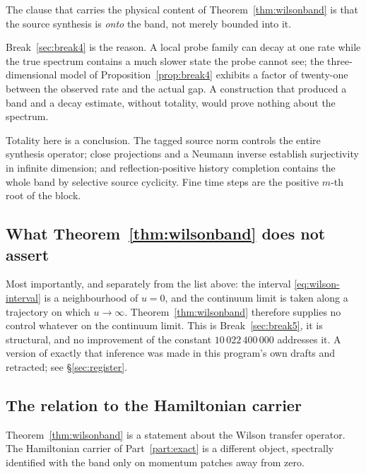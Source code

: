 The clause that carries the physical content of
Theorem~\ref{thm:wilsonband} is that the source synthesis is \emph{onto}
the band, not merely bounded into it.

Break~\ref{sec:break4} is the reason. A local probe family can decay at
one rate while the true spectrum contains a much slower state the probe
cannot see; the three-dimensional model of Proposition~\ref{prop:break4}
exhibits a factor of twenty-one between the observed rate and the actual
gap. A construction that produced a band and a decay estimate, without
totality, would prove nothing about the spectrum.

Totality here is a conclusion. The tagged source norm controls the
entire synthesis operator; close projections and a Neumann inverse
establish surjectivity in infinite dimension; and reflection-positive
history completion contains the whole band by selective source
cyclicity. Fine time steps are the positive $m$-th root of the block.

\subsection{What Theorem~\ref{thm:wilsonband} does not assert}


Most importantly, and separately from the list above: the interval
\eqref{eq:wilson-interval} is a neighbourhood of $u = 0$, and the
continuum limit is taken along a trajectory on which $u \to \infty$.
Theorem~\ref{thm:wilsonband} therefore supplies no control whatever on
the continuum limit. This is Break~\ref{sec:break5}, it is structural,
and no improvement of the constant $10\,022\,400\,000$ addresses it.
A version of exactly that inference was made in this program's own
drafts and retracted; see \S\ref{sec:register}.

\subsection{The relation to the Hamiltonian carrier}

Theorem~\ref{thm:wilsonband} is a statement about the Wilson transfer
operator. The Hamiltonian carrier of Part~\ref{part:exact} is a
different object, spectrally identified with the band only on momentum
patches away from zero.

